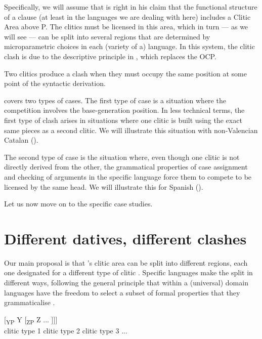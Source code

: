 \documentclass[output=paper,modfonts,nonflat,newtxmath,colorlinks,citecolor=brown]{langsci/langscibook}
\begin{document}
 \label{ex:cabre:6}
    \z


Specifically, we will assume that \citet{Sportiche1996} is right in his claim that the functional structure of a clause (at least in the languages we are dealing with here) includes a Clitic Area above \liv P. The clitics must be licensed in this area, which in turn — as we will see — can be split into several regions that are determined by microparametric choices in each (variety of a) language. In this system, the clitic clash is due to the descriptive principle in , which replaces the OCP.

\ea%
\label{ex:cabre:7}
    Two clitics produce a clash when they must occupy the same   position at some point of the syntactic derivation.
    \z




 covers two types of cases. The first type of case is a situation where the competition involves the base-generation position. In less technical terms, the first type of clash arises in situations where one clitic is built using the exact same pieces as a second clitic. We will illustrate this situation with non-Valencian Catalan ().

The second type of case is the situation where, even though one clitic is not directly derived from the other, the grammatical properties of case assignment and checking of arguments in the specific language force them to compete to be licensed by the same head. We will illustrate this for Spanish ().

Let us now move on to the specific case studies.

\section{Different datives, different clashes} %
\label{sec:cabre:3}

Our main proposal is that \citeauthor{Sportiche1996}’s clitic area can be split into different regions, each one designated for a different type of clitic . Specific languages make the split in different ways, following the general principle that within a (universal) domain languages have the freedom to select a subset of formal properties that they grammaticalise \citep{RamchandSvenonius2014, Wiltschko2014}.

\ea%
    \label{ex:cabre:8}
    \gll {[\textsubscript{XP} X} { } {[\textsubscript{YP} Y} { }  {[\textsubscript{ZP}  Z} ...  ]]]\\
        \footnotesize {clitic type 1} { } \footnotesize {clitic type 2} { } \footnotesize   {clitic type 3} ...\\
    \glt
    \z
\end{document}
